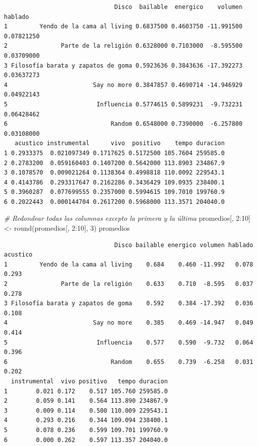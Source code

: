 \documentclass[
]{book}
\newenvironment{Shaded}{\begin{snugshade}}{\end{snugshade}}
\newcommand{\CommentTok}[1]{\textcolor[rgb]{0.56,0.35,0.01}{\textit{#1}}}
\newcommand{\DecValTok}[1]{\textcolor[rgb]{0.00,0.00,0.81}{#1}}
\newcommand{\FunctionTok}[1]{\textcolor[rgb]{0.00,0.00,0.00}{#1}}
\newcommand{\NormalTok}[1]{#1}
\newcommand{\OtherTok}[1]{\textcolor[rgb]{0.56,0.35,0.01}{#1}}
\newcommand{\SpecialCharTok}[1]{\textcolor[rgb]{0.00,0.00,0.00}{#1}}
\begin{document}
\begin{verbatim}
                               Disco  bailable  energico    volumen    hablado
1         Yendo de la cama al living 0.6837500 0.4603750 -11.991500 0.07821250
2               Parte de la religión 0.6328000 0.7103000  -8.595500 0.03709000
3 Filosofía barata y zapatos de goma 0.5923636 0.3843636 -17.392273 0.03637273
4                        Say no more 0.3847857 0.4690714 -14.946929 0.04922143
5                         Influencia 0.5774615 0.5899231  -9.732231 0.06428462
6                             Random 0.6548000 0.7390000  -6.257800 0.03108000
   acustico instrumental      vivo  positivo    tempo duracion
1 0.2933375  0.021097349 0.1717625 0.5172500 105.7604 259585.0
2 0.2783200  0.059160403 0.1407200 0.5642000 113.8903 234867.9
3 0.1078570  0.009021264 0.1138364 0.4998818 110.0092 229543.1
4 0.4143786  0.293317647 0.2162286 0.3436429 109.0935 238400.1
5 0.3960287  0.077699555 0.2357000 0.5994615 109.7010 199760.9
6 0.2022443  0.000144704 0.2617200 0.5968000 113.3571 204040.0
\end{verbatim}

\begin{Shaded}
\begin{Highlighting}[]
\CommentTok{\# Redondear todas las columnas excepto la primera y la última}
\NormalTok{promedios[, }\DecValTok{2}\SpecialCharTok{:}\DecValTok{10}\NormalTok{] }\OtherTok{\textless{}{-}} \FunctionTok{round}\NormalTok{(promedios[, }\DecValTok{2}\SpecialCharTok{:}\DecValTok{10}\NormalTok{], }\DecValTok{3}\NormalTok{)}
\NormalTok{promedios}
\end{Highlighting}
\end{Shaded}

\begin{verbatim}
                               Disco bailable energico volumen hablado acustico
1         Yendo de la cama al living    0.684    0.460 -11.992   0.078    0.293
2               Parte de la religión    0.633    0.710  -8.595   0.037    0.278
3 Filosofía barata y zapatos de goma    0.592    0.384 -17.392   0.036    0.108
4                        Say no more    0.385    0.469 -14.947   0.049    0.414
5                         Influencia    0.577    0.590  -9.732   0.064    0.396
6                             Random    0.655    0.739  -6.258   0.031    0.202
  instrumental  vivo positivo   tempo duracion
1        0.021 0.172    0.517 105.760 259585.0
2        0.059 0.141    0.564 113.890 234867.9
3        0.009 0.114    0.500 110.009 229543.1
4        0.293 0.216    0.344 109.094 238400.1
5        0.078 0.236    0.599 109.701 199760.9
6        0.000 0.262    0.597 113.357 204040.0
\end{verbatim}
\end{document}
